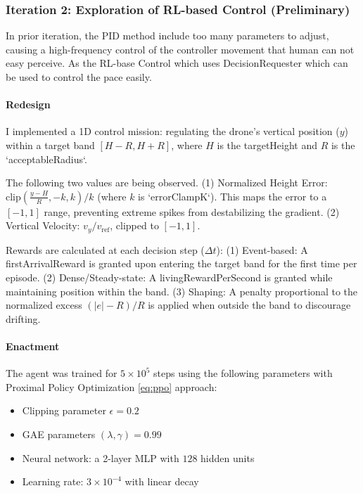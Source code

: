 \subsubsection{Iteration 2: Exploration of RL-based Control (Preliminary)}

In prior iteration, the PID method include too many parameters to adjust, causing a high-frequency control of the controller movement that human can not easy perceive. As the RL-base Control which uses DecisionRequester which can be used to control the pace easily.

\paragraph{Redesign}

I implemented a 1D control mission: regulating the drone's vertical position ($y$) within a target band $[H - R, H + R]$, where $H$ is the targetHeight and $R$ is the `acceptableRadius`.

The following two values are being observed. (1) Normalized Height Error: $\text{clip}(\frac{y - H}{R}, -k, k) / k$ (where $k$ is `errorClampK`). This maps the error to a $[-1, 1]$ range, preventing extreme spikes from destabilizing the gradient. (2) Vertical Velocity: $v_y / v_{\text{ref}}$, clipped to $[-1, 1]$.

Rewards are calculated at each decision step ($\Delta t$): (1) Event-based: A firstArrivalReward is granted upon entering the target band for the first time per episode. (2) Dense/Steady-state: A livingRewardPerSecond is granted while maintaining position within the band. (3) Shaping: A penalty proportional to the normalized excess $(|e|-R)/R$ is applied when outside the band to discourage drifting.

\paragraph{Enactment}

The agent was trained for $5 \times 10^5$ steps using the following parameters with Proximal Policy Optimization \cref{eq:ppo} approach:

\begin{itemize}
    \item Clipping parameter $\epsilon = 0.2$
    \item GAE parameters $(\lambda, \gamma) = 0.99$
    \item Neural network: a 2-layer MLP with $128$ hidden units
    \item Learning rate: $3 \times 10^{-4}$ with linear decay
\end{itemize}

